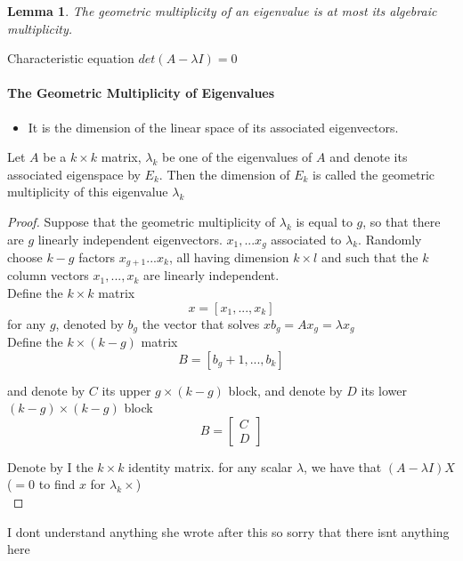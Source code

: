 \documentclass{article}
\newtheorem{lemma}[theorem]{Lemma}
\theoremstyle{definition}
\theoremstyle{remark}
\begin{document}
\begin{lemma}
    The geometric multiplicity of an eigenvalue is at most its algebraic multiplicity. 
\end{lemma}

Characteristic equation $det(A - \lambda I) = 0$

\paragraph{The Geometric Multiplicity of Eigenvalues}
\begin{itemize}
    \item It is the dimension of the linear space of its associated eigenvectors.
\end{itemize}

Let $A$ be a $k \times k$ matrix, $\lambda_k$ be one of the eigenvalues of $A$ and denote its associated eigenspace by $E_k$. Then the dimension of $E_k$ is called the geometric multiplicity of this eigenvalue $\lambda_k$ 


\begin{proof}
    Suppose that the geometric multiplicity of $\lambda_k$ is equal to $g$, so that there are $g$ linearly independent eigenvectors. $x_1,...x_g$ associated to $\lambda_k$. Randomly choose $k-g$ factors $x_{g+1}... x_k$, all having dimension $k \times l$ and such that the $k$ column vectors $x_1, ... ,x_k$ are linearly independent. \\

    Define the $k \times k$ matrix $$x = [x_1, ... , x_k]$$ for any $g$, denoted by $b_g$ the vector that solves $xb_g = Ax_g = \lambda x_g$ \\ 

    Define the $k \times (k-g)$ matrix $$B = [b_g+1, ... , b_k]$$

    and denote by $C$ its upper $g \times (k-g)$ block, and denote by $D$ its lower $(k-g) \times (k-g)$ block $$B = \begin{bmatrix}
        C \\ D
    \end{bmatrix}$$

    Denote by I the $k \times k$ identity matrix. for any scalar $\lambda$, we have that $(A- \lambda I)X$ ($= 0$ to find $x$ for $\lambda_k \times$) \\ 

    
    
\end{proof}

I dont understand anything she wrote after this so sorry that there isnt anything here
\end{document}
